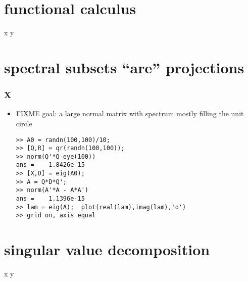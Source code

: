 \documentclass[10pt,hyperref]{beamer}
\begin{document}
\section{functional calculus}

\begin{frame}{x}
y
\end{frame}


\section{spectral subsets ``are'' projections}

\begin{frame}[fragile]
\frametitle{X}

\begin{itemize}
\item FIXME  goal: a large normal matrix with spectrum mostly filling the unit circle

\begin{Verbatim}[fontsize=\scriptsize]
>> A0 = randn(100,100)/10;
>> [Q,R] = qr(randn(100,100));
>> norm(Q'*Q-eye(100))
ans =    1.8426e-15
>> [X,D] = eig(A0);
>> A = Q*D*Q';
>> norm(A'*A - A*A')
ans =    1.1396e-15
>> lam = eig(A);  plot(real(lam),imag(lam),'o')
>> grid on, axis equal
\end{Verbatim}

\end{itemize}
\end{frame}


\section{singular value decomposition}

\begin{frame}{x}
y
\end{frame}
\end{document}
